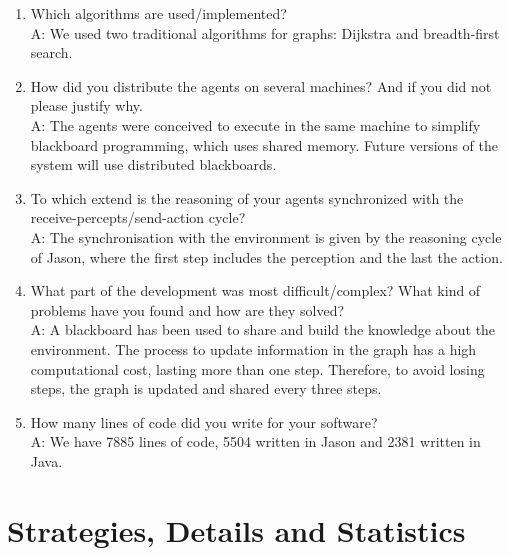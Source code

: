 \begin{enumerate}
	\item  Which algorithms are used/implemented?\\
	A: We used two traditional algorithms for graphs: Dijkstra and breadth-first search.%
	
	\item  How did you distribute the agents on several machines? And if you did not please justify why.\\
	A: The agents were conceived to execute in the same machine to simplify blackboard programming, which uses shared memory. Future versions of the system will use distributed blackboards.%
		
	\item  To which extend is the reasoning of your agents synchronized with the receive-percepts/send-action cycle?\\
	A: The synchronisation with the environment is given by the reasoning cycle of Jason, where the first step includes the perception and the last the action.%
		
	\item  What part of the development was most difficult/complex? What kind of problems have you found and how are they solved?\\
	A: A blackboard has been used to share and build the knowledge about the environment. The process to update information in the graph has a high computational cost, lasting more than one step. Therefore, to avoid losing steps, the graph is updated and shared every three steps.%
		
	\item  How many lines of code did you write for your software?\\
	A: We have 7885 lines of code, 5504 written in Jason and 2381 written in Java.%
		
		
\end{enumerate}

\section{Strategies, Details and Statistics}

